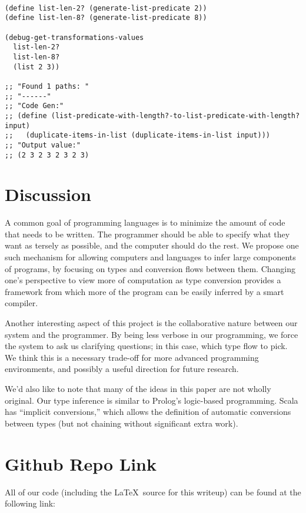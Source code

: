 \documentclass[letterpaper]{article}
\begin{document}
\begin{verbatim}

(define list-len-2? (generate-list-predicate 2))
(define list-len-8? (generate-list-predicate 8))

(debug-get-transformations-values
  list-len-2?
  list-len-8?
  (list 2 3))

;; "Found 1 paths: "
;; "------"
;; "Code Gen:"
;; (define (list-predicate-with-length?-to-list-predicate-with-length? input)
;;   (duplicate-items-in-list (duplicate-items-in-list input)))
;; "Output value:"
;; (2 3 2 3 2 3 2 3)

\end{verbatim}

\section{Discussion}

A common goal of programming languages is to minimize the amount of code that needs to be written.  The programmer should be able to specify what they want as tersely as possible, and the computer should do the rest.  We propose one such mechanism for allowing computers and languages to infer large components of programs, by focusing on types and conversion flows between them.  Changing one's perspective to view more of computation as type conversion provides a framework from which more of the program can be easily inferred by a smart compiler.

Another interesting aspect of this project is the collaborative nature between our system and the programmer.  By being less verbose in our programming, we force the system to ask us clarifying questions; in this case, which type flow to pick.  We think this is a necessary trade-off for more advanced programming environments, and possibly a useful direction for future research.

We'd also like to note that many of the ideas in this paper are not wholly original.  Our type inference is similar to Prolog's logic-based programming.  Scala has ``implicit conversions,'' which allows the definition of automatic conversions between types (but not chaining without significant extra work).

\appendix
\section{Github Repo Link}

All of our code (including the \LaTeX\, source for this writeup) can be found at the following link:
\end{document}
